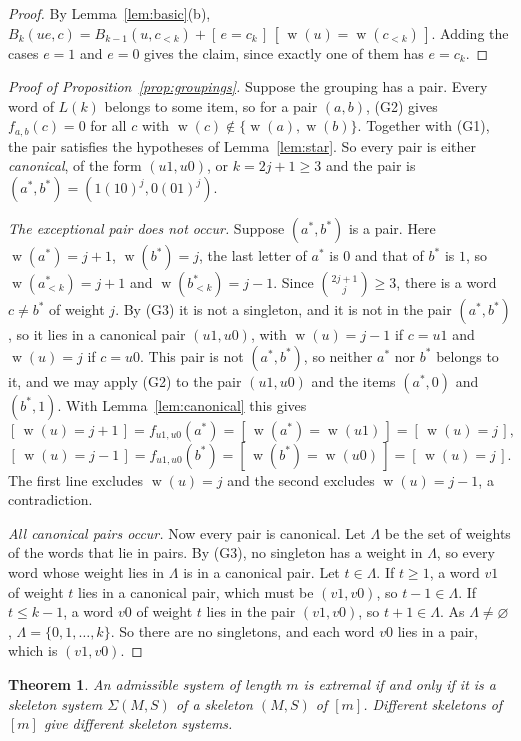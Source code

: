 \documentclass[11pt]{amsart}
\newtheorem{theorem}{Theorem}[section]
\theoremstyle{definition}
\theoremstyle{remark}
\numberwithin{equation}{section}
\newcommand{\Iv}[1]{[\,#1\,]}
\DeclareMathOperator{\wt}{w}
\begin{document}
\begin{proof}
By Lemma~\ref{lem:basic}(b), $B_k(ue,c)=B_{k-1}(u,c_{<k})+\Iv{e=c_k}\,\Iv{\wt(u)=\wt(c_{<k})}$. Adding the cases $e=1$ and $e=0$ gives the claim, since exactly one of them has $e=c_k$.
\end{proof}

\begin{proof}[Proof of Proposition~\ref{prop:groupings}]
Suppose the grouping has a pair. Every word of $L(k)$ belongs to some item, so for a pair $(a,b)$, (G2) gives $f_{a,b}(c)=0$ for all $c$ with $\wt(c)\notin\{\wt(a),\wt(b)\}$. Together with (G1), the pair satisfies the hypotheses of Lemma~\ref{lem:star}. So every pair is either \emph{canonical}, of the form $(u1,u0)$, or $k=2j+1\ge3$ and the pair is $(a^*,b^*)=(1(10)^j,0(01)^j)$.

\emph{The exceptional pair does not occur.} Suppose $(a^*,b^*)$ is a pair. Here $\wt(a^*)=j+1$, $\wt(b^*)=j$, the last letter of $a^*$ is $0$ and that of $b^*$ is $1$, so $\wt(a^*_{<k})=j+1$ and $\wt(b^*_{<k})=j-1$. Since $\binom{2j+1}{j}\ge3$, there is a word $c\ne b^*$ of weight $j$. By (G3) it is not a singleton, and it is not in the pair $(a^*,b^*)$, so it lies in a canonical pair $(u1,u0)$, with $\wt(u)=j-1$ if $c=u1$ and $\wt(u)=j$ if $c=u0$. This pair is not $(a^*,b^*)$, so neither $a^*$ nor $b^*$ belongs to it, and we may apply (G2) to the pair $(u1,u0)$ and the items $(a^*,0)$ and $(b^*,1)$. With Lemma~\ref{lem:canonical} this gives
\[
\Iv{\wt(u)=j+1}=f_{u1,u0}(a^*)=\Iv{\wt(a^*)=\wt(u1)}=\Iv{\wt(u)=j},
\]
\[
\Iv{\wt(u)=j-1}=f_{u1,u0}(b^*)=\Iv{\wt(b^*)=\wt(u0)}=\Iv{\wt(u)=j}.
\]
The first line excludes $\wt(u)=j$ and the second excludes $\wt(u)=j-1$, a contradiction.

\emph{All canonical pairs occur.} Now every pair is canonical. Let $\Lambda$ be the set of weights of the words that lie in pairs. By (G3), no singleton has a weight in $\Lambda$, so every word whose weight lies in $\Lambda$ is in a canonical pair. Let $t\in\Lambda$. If $t\ge1$, a word $v1$ of weight $t$ lies in a canonical pair, which must be $(v1,v0)$, so $t-1\in\Lambda$. If $t\le k-1$, a word $v0$ of weight $t$ lies in the pair $(v1,v0)$, so $t+1\in\Lambda$. As $\Lambda\ne\varnothing$, $\Lambda=\{0,1,\dots,k\}$. So there are no singletons, and each word $v0$ lies in a pair, which is $(v1,v0)$.
\end{proof}

\begin{theorem}\label{thm:main}
An admissible system of length $m$ is extremal if and only if it is a skeleton system $\Sigma(M,S)$ of a skeleton $(M,S)$ of $[m]$. Different skeletons of $[m]$ give different skeleton systems.
\end{theorem}
\end{document}
